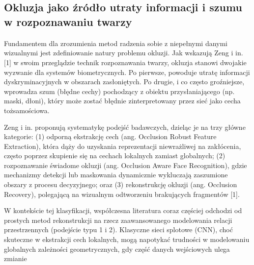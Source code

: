 \subsection{Okluzja jako źródło utraty informacji i szumu w rozpoznawaniu twarzy}

\paragraph{}Fundamentem dla zrozumienia metod radzenia sobie z niepełnymi danymi wizualnymi jest zdefiniowanie natury problemu okluzji. Jak wskazują Zeng i in. [1] w swoim przeglądzie technik rozpoznawania twarzy, okluzja stanowi dwojakie wyzwanie dla systemów biometrycznych. Po pierwsze, powoduje utratę informacji dyskryminacyjnych w obszarach zasłoniętych. Po drugie, i co często groźniejsze, wprowadza szum (błędne cechy) pochodzący z obiektu przysłaniającego (np. maski, dłoni), który może zostać błędnie zinterpretowany przez sieć jako cecha tożsamościowa.

Zeng i in. proponują systematykę podejść badawczych, dzieląc je na trzy główne kategorie: (1) odporną ekstrakcję cech (ang. Occlusion Robust Feature Extraction), która dąży do uzyskania reprezentacji niewrażliwej na zakłócenia, często poprzez skupienie się na cechach lokalnych zamiast globalnych; (2) rozpoznawanie świadome okluzji (ang. Occlusion Aware Face Recognition), gdzie mechanizmy detekcji lub maskowania dynamicznie wykluczają zaszumione obszary z procesu decyzyjnego; oraz (3) rekonstrukcję okluzji (ang. Occlusion Recovery), polegającą na wizualnym odtworzeniu brakujących fragmentów [1].

W kontekście tej klasyfikacji, współczesna literatura coraz częściej odchodzi od prostych metod rekonstrukcji na rzecz zaawansowanego modelowania relacji przestrzennych (podejście typu 1 i 2). Klasyczne sieci splotowe (CNN), choć skuteczne w ekstrakcji cech lokalnych, mogą napotykać trudności w modelowaniu globalnych zależności geometrycznych, gdy część danych wejściowych ulega zmianie